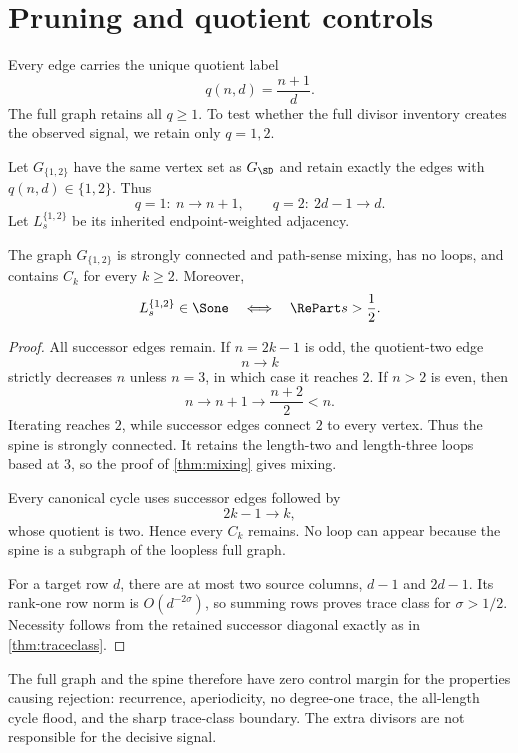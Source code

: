 \section{Pruning and quotient controls}
\label{sec:controls}

Every edge carries the unique quotient label
\[
 q(n,d)=\frac{n+1}{d}.
\]
The full graph retains all \(q\ge1\).  To test whether the full divisor
inventory creates the observed signal, we retain only \(q=1,2\).

\begin{definition}
Let \(G_{\{1,2\}}\) have the same vertex set as \(G_{\SD}\) and retain exactly
the edges with \(q(n,d)\in\{1,2\}\).  Thus
\[
 q=1:\ n\to n+1,
 \qquad
 q=2:\ 2d-1\to d.
\]
Let \(L_s^{\{1,2\}}\) be its inherited endpoint-weighted adjacency.
\end{definition}

\begin{theorem}
\label{thm:spine}
The graph \(G_{\{1,2\}}\) is strongly connected and path-sense mixing, has no
loops, and contains \(C_k\) for every \(k\ge2\).  Moreover,
\[
 L_s^{\{1,2\}}\in\Sone
 \quad\Longleftrightarrow\quad
 \RePart s>\frac12.
\]
\end{theorem}

\begin{proof}
All successor edges remain.  If \(n=2k-1\) is odd, the quotient-two edge
\[
 n\to k
\]
strictly decreases \(n\) unless \(n=3\), in which case it reaches \(2\).
If \(n>2\) is even, then
\[
 n\to n+1\to\frac{n+2}{2}<n.
\]
Iterating reaches \(2\), while successor edges connect \(2\) to every
vertex.  Thus the spine is strongly connected.  It retains the length-two
and length-three loops based at \(3\), so the proof of
\cref{thm:mixing} gives mixing.

Every canonical cycle uses successor edges followed by
\[
 2k-1\to k,
\]
whose quotient is two.  Hence every \(C_k\) remains.  No loop can appear
because the spine is a subgraph of the loopless full graph.

For a target row \(d\), there are at most two source columns, \(d-1\) and
\(2d-1\).  Its rank-one row norm is \(O(d^{-2\sigma})\), so summing rows
proves trace class for \(\sigma>1/2\).  Necessity follows from the retained
successor diagonal exactly as in \cref{thm:traceclass}.
\end{proof}

The full graph and the spine therefore have zero control margin for the
properties causing rejection: recurrence, aperiodicity, no degree-one trace,
the all-length cycle flood, and the sharp trace-class boundary.  The extra
divisors are not responsible for the decisive signal.

